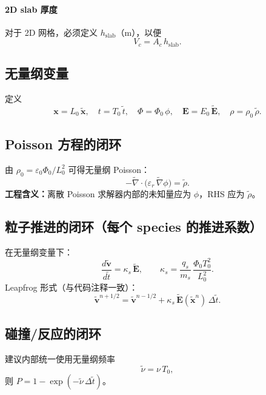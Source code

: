 \documentclass[11pt,a4paper]{ctexart}
\begin{document}
\paragraph{2D slab 厚度}
对于 2D 网格，必须定义 $h_{\mathrm{slab}}$（\si{m}），以便
\begin{equation}
V_c = A_c\,h_{\mathrm{slab}}.
\end{equation}

\subsection{无量纲变量}
定义
\begin{equation}
\bm{x}=L_0\,\tilde{\bm{x}},\quad t=T_0\,\tilde{t},\quad \Phi=\Phi_0\,\phi,
\quad \bm{E}=E_0\,\tilde{\bm{E}},\quad \rho=\rho_0\,\tilde{\rho}.
\end{equation}

\subsection{Poisson 方程的闭环}
由 $\rho_0=\varepsilon_0\Phi_0/L_0^2$ 可得无量纲 Poisson：
\begin{equation}
-\tilde{\nabla}\cdot\bigl(\varepsilon_r\,\tilde{\nabla}\phi\bigr)=\tilde{\rho}.
\end{equation}
\textbf{工程含义：}离散 Poisson 求解器内部的未知量应为 $\phi$，RHS 应为 $\tilde{\rho}$。

\subsection{粒子推进的闭环（每个 species 的推进系数）}
在无量纲变量下：
\begin{equation}
\frac{d\tilde{\bm{v}}}{d\tilde{t}}=\kappa_s\,\tilde{\bm{E}},
\qquad \kappa_s=\frac{q_s}{m_s}\,\frac{\Phi_0 T_0^2}{L_0^2}.
\end{equation}
Leapfrog 形式（与代码注释一致）：
\begin{equation}
\tilde{\bm{v}}^{n+1/2}=\tilde{\bm{v}}^{n-1/2}+\kappa_s\,\tilde{\bm{E}}(\tilde{\bm{x}}^n)\,\Delta\tilde{t}.
\end{equation}

\subsection{碰撞/反应的闭环}
建议内部统一使用无量纲频率
\begin{equation}
\tilde{\nu}=\nu\,T_0,
\end{equation}
则 $P=1-\exp(-\tilde{\nu}\,\Delta\tilde{t})$。
\end{document}
